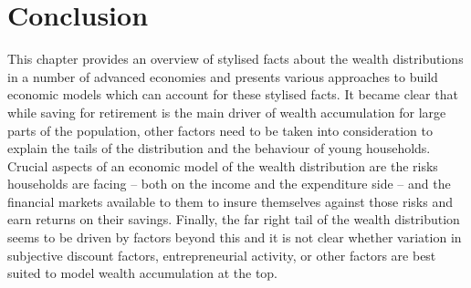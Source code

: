 \section{Conclusion}
This chapter provides an overview of stylised facts about the wealth 
distributions in a number of advanced economies and presents various approaches 
to build economic models which can account for these stylised facts.
It became clear that while saving for retirement is the main driver of wealth
accumulation for large parts of the population, other factors need to be taken
into consideration to explain the tails of the distribution and the behaviour of
young households. Crucial aspects of an economic model of the wealth 
distribution are the risks households are facing -- both on the income and the 
expenditure side -- and the financial markets available to them to insure 
themselves against those risks and earn returns on their savings. Finally, the 
far right tail of the wealth distribution seems to be driven by factors beyond 
this and it is not clear whether variation in subjective discount factors, 
entrepreneurial activity, or other factors are best suited to model wealth 
accumulation at the top.
 